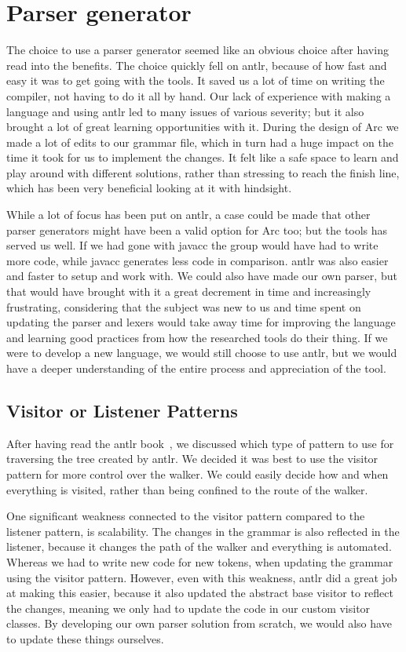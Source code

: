 \section{Parser generator}\label{sec:discussion_parserGenerator}

The choice to use a parser generator seemed like an obvious choice after having read into the benefits. The choice quickly fell on \gls{antlr}, because of how fast and easy it was to get going with the tools. It saved us a lot of time on writing the compiler, not having to do it all by hand. Our lack of experience with making a language and using \gls{antlr} led to many issues of various severity; but it also brought a lot of great learning opportunities with it. During the design of Arc we made a lot of edits to our grammar file, which in turn had a huge impact on the time it took for us to implement the changes. It felt like a safe space to learn and play around with different solutions, rather than stressing to reach the finish line, which has been very beneficial looking at it with hindsight.

While a lot of focus has been put on \gls{antlr}, a case could be made that other parser generators might have been a valid option for Arc too; but the tools has served us well. If we had gone with \gls{javacc} the group would have had to write more code, while \gls{javacc} generates less code in comparison. \gls{antlr} was also easier and faster to setup and work with. We could also have made our own parser, but that would have brought with it a great decrement in time and increasingly frustrating, considering that the subject was new to us and time spent on updating the parser and lexers would take away time for improving the language and learning good practices from how the researched tools do their thing. If we were to develop a new language, we would still choose to use \gls{antlr}, but we would have a deeper understanding of the entire process and appreciation of the tool.

\subsection{Visitor or Listener Patterns}

After having read the \gls{antlr} book~\cite{Parr2014}, we discussed which type of pattern to use for traversing the tree created by \gls{antlr}. We decided it was best to use the visitor pattern for more control over the walker. We could easily decide how and when everything is visited, rather than being confined to the route of the walker.

One significant weakness connected to the visitor pattern compared to the listener pattern, is scalability. The changes in the grammar is also reflected in the listener, because it changes the path of the walker and everything is automated. Whereas we had to write new code for new tokens, when updating the grammar using the visitor pattern. However, even with this weakness, \gls{antlr} did a great job at making this easier, because it also updated the abstract base visitor to reflect the changes, meaning we only had to update the code in our custom visitor classes. By developing our own parser solution from scratch, we would also have to update these things ourselves.